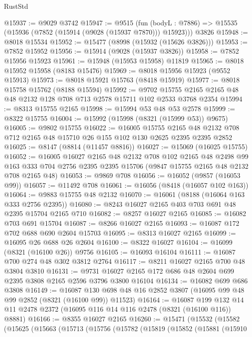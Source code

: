 \begin{lexlean}{RustStd}
\begin{coremodule}
@15937 := @9029 @3742
@15947 := @9515
    (fun (bodyL : @7886) => @15535 (@15936 (@7852 (@15914 (@9028 (@15937 @7870))) @15923)))
    @3826
@15948 := @8018 @15534
@15952 := @15477 (@8998 (@15932 (@15626 @3826)))
@15953 := @7852 @15952
@15956 := @15914 (@9028 (@15937 @3826))
@15958 := @7852 @15956 @15923
@15961 := @15948 (@15953 @15958) @11819
@15965 := @8018 @15952 @15958 (@8183 @15476)
@15969 := @8018 @15956 @15923 (@9552 @15913)
@15973 := @8018 @15921 @15763 (@8418 @15919)
@15977 := @8018 @15758 @15762 (@8188 @15594)
@15992 := @9702 @15755 @2165 @2165 @48 @48 @2132 @128 @708 @713 @2578 @15711 @102 @2533 @3768 @2354
@15994 := @8313 @15755 @2165
@15998 := @15994 @53 @48 @53 @2578
@15999 := @8322 @15755
@16004 := @15992 (@15998 (@8321 (@15999 @53)) @9675)
@16005 := @9802 @15755
@16022 := @16005
    @15755
    @2165
    @48
    @2132
    @708
    @712
    @2165
    @48
    @15710
    @26
    @155
    @102
    @130
    @2625
    @2395
    @2395
    @2852
@16025 := @8147 (@8814 (@11457 @8816))
@16027 := @15069 (@16025 @15755)
@16052 := @16005
    @16027
    @2165
    @48
    @2132
    @708
    @102
    @2165
    @48
    @2498
    @99
    @163
    @333
    @704
    @2756
    @2395
    @2395
    @15706
    (@9847 @15755 @2165 @48 @2132 @708 @2165 @48)
@16053 := @9869 @708
@16056 := @16052 (@9857 (@16053 @99))
@16057 := @11492 @708
@16061 := @16056 (@8418 (@16057 @102 @163))
@16064 := @9883 @15755 @48 @2132
@16070 := @16061 (@8188 (@16064 @163 @333 @2756 @2395))
@16080 := @8243 @16027 @2165 @403 @703 @691 @48 @2395 @15704 @2165 @710
@16082 := @8257 @16027 @2165
@16085 := @16082 @703 @691 @15704
@16087 := @8266 @16027 @2165
@16093 := @16087 @172 @702 @688 @690 @2604 @15703
@16095 := @8313 @16027 @2165
@16099 := @16095 @26 @688 @26 @2604
@16100 := @8322 @16027
@16104 := @16099 (@8321 (@16100 @26)) @9756
@16105 := @16093 @16104
@16111 := @16087 @700 @274 @48 @302 @3812 @2764
@16117 := @8211 @16027 @2165 @700 @48 @3804 @3810
@16131 := @9731 @16027 @2165 @172 @686 @48 @2604 @699 @2395 @3808 @2165 @2596 @3796 @3800 @16104
@16134 := @16082 @699 @686 @3808
@16149 := @16087
    @130
    @698
    @48
    @16
    @2852
    @3807
    (@16095 @99 @48 @99 @2852 (@8321 (@16100 @99)) @11523)
@16164 := @16087
    @199
    @132
    @14
    @11
    @2478
    @2372
    (@16095 @116 @14 @116 @2478 (@8321 (@16100 @116)) @8881)
@16166 := @8355 @16027 @2165
@16260 := @15471
    (@15532
      (@15582
        (@15625
          (@15663
            (@15713
              (@15756
                (@15782
                  (@15819
                    (@15852
                      (@15881
                        (@15910

\end{coremodule}
\end{lexlean}
